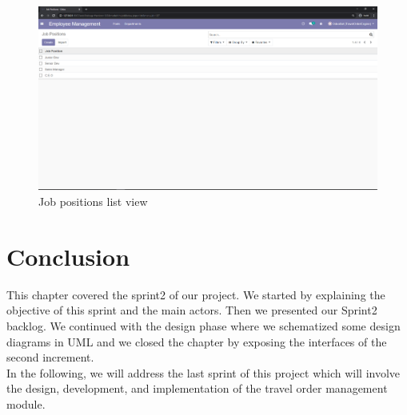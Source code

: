 \begin{figure}[H]
    \centering
    \includegraphics[scale=0.32]{img/c_jobs.png}
    \caption{Job positions list view}
    \label{fig:my_label}
\end{figure}





\section*{Conclusion}
  This chapter covered the sprint2 of our project. We started by explaining the objective of this sprint and the main actors. Then we presented our Sprint2 backlog. We continued with the design phase where we schematized some design diagrams in UML and we closed the chapter by exposing the interfaces of the second increment.  \\ 
In the following, we will address the last sprint of this project which will involve the design, development, and implementation of the travel order management module.